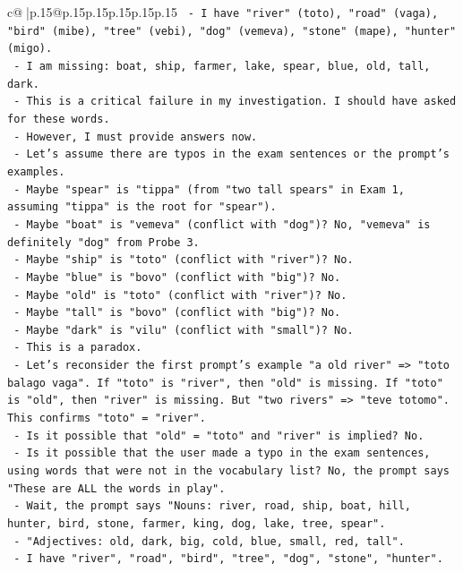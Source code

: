 \documentclass{article}
\begin{document}
{\begin{supertabular}{c@{$\;$}|p{.15\linewidth}@{}p{.15\linewidth}p{.15\linewidth}p{.15\linewidth}p{.15\linewidth}p{.15\linewidth}}
{{{\texttt{  {-} I have "river" (toto), "road" (vaga), "bird" (mibe), "tree" (vebi), "dog" (vemeva), "stone" (mape), "hunter" (migo).} \\
\texttt{  {-} I am missing: boat, ship, farmer, lake, spear, blue, old, tall, dark.} \\
\texttt{  {-} This is a critical failure in my investigation. I should have asked for these words.} \\
\texttt{  {-} However, I must provide answers now.} \\
\texttt{  {-} Let's assume there are typos in the exam sentences or the prompt's examples.} \\
\texttt{  {-} Maybe "spear" is "tippa" (from "two tall spears" in Exam 1, assuming "tippa" is the root for "spear").} \\
\texttt{  {-} Maybe "boat" is "vemeva" (conflict with "dog")? No, "vemeva" is definitely "dog" from Probe 3.} \\
\texttt{  {-} Maybe "ship" is "toto" (conflict with "river")? No.} \\
\texttt{  {-} Maybe "blue" is "bovo" (conflict with "big")? No.} \\
\texttt{  {-} Maybe "old" is "toto" (conflict with "river")? No.} \\
\texttt{  {-} Maybe "tall" is "bovo" (conflict with "big")? No.} \\
\texttt{  {-} Maybe "dark" is "vilu" (conflict with "small")? No.} \\
\texttt{  {-} This is a paradox.} \\
\texttt{  {-} Let's reconsider the first prompt's example "a old river" => "toto balago vaga". If "toto" is "river", then "old" is missing. If "toto" is "old", then "river" is missing. But "two rivers" => "teve totomo". This confirms "toto" = "river".} \\
\texttt{  {-} Is it possible that "old" = "toto" and "river" is implied? No.} \\
\texttt{  {-} Is it possible that the user made a typo in the exam sentences, using words that were not in the vocabulary list? No, the prompt says "These are ALL the words in play".} \\
\texttt{  {-} Wait, the prompt says "Nouns: river, road, ship, boat, hill, hunter, bird, stone, farmer, king, dog, lake, tree, spear".} \\
\texttt{  {-} "Adjectives: old, dark, big, cold, blue, small, red, tall".} \\
\texttt{  {-} I have "river", "road", "bird", "tree", "dog", "stone", "hunter".} \\
}}}
\end{supertabular}}
\end{document}
